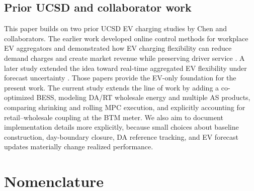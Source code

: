 \documentclass[final,5p,times]{elsarticle}
\begin{document}
\subsection{Prior UCSD and collaborator work}

This paper builds on two prior UCSD EV charging studies by Chen and collaborators. The earlier work developed online control methods for workplace EV aggregators and demonstrated how EV charging flexibility can reduce demand charges and create market revenue while preserving driver service \cite{chen2024costoptimal}. A later study extended the idea toward real-time aggregated EV flexibility under forecast uncertainty \cite{chen2026realtime}. Those papers provide the EV-only foundation for the present work. The current study extends the line of work by adding a co-optimized BESS, modeling DA/RT wholesale energy and multiple AS products, comparing shrinking and rolling MPC execution, and explicitly accounting for retail--wholesale coupling at the BTM meter. We also aim to document implementation details more explicitly, because small choices about baseline construction, day-boundary closure, DA reference tracking, and EV forecast updates materially change realized performance.

\section{Nomenclature}
\label{sec:nomenclature}
\end{document}
